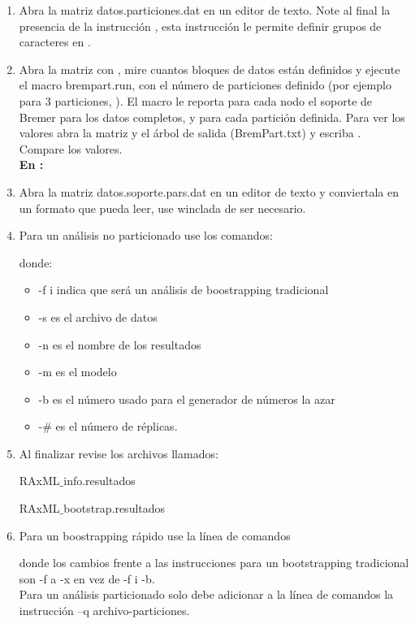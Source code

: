 \begin{enumerate}
\item Abra la matriz datos.particiones.dat en un editor de texto. Note al final la presencia de la instrucci\'on , esta instrucci\'on le permite definir grupos de caracteres en .\\
\item Abra la matriz con , mire cuantos bloques de datos est\'an definidos y ejecute el macro brempart.run, con el n\'umero de particiones definido (por ejemplo para 3 particiones, ). El macro le reporta para cada nodo el soporte de Bremer para los datos completos, y para cada partici\'on definida. Para ver los valores abra la matriz y el \'arbol de salida (BremPart.txt) y escriba . Compare los valores.\\
\textbf{En :}\\
\item Abra la matriz datos.soporte.pars.dat en un editor de texto y conviertala en un formato que  pueda leer, use winclada de ser necesario. \\
\item Para un an\'alisis no particionado use los comandos:


donde:
\begin{itemize}
\item  -f i indica que ser\'a un an\'alisis de boostrapping tradicional
\item  -s es el archivo de datos
\item  -n es el nombre de los resultados
\item  -m es el modelo
\item  -b es el n\'umero usado para el generador de n\'umeros la azar
\item  -$\#$ es el n\'umero de r\'eplicas.
\end{itemize}

\item Al finalizar revise los archivos llamados:

  RAxML$\_$info.resultados 

  RAxML$\_$bootstrap.resultados


\item Para un boostrapping r\'apido use la l\'inea de comandos



donde los cambios frente a las instrucciones para un bootstrapping tradicional son -f a  -x en vez de -f i -b. \\

Para un an\'alisis particionado solo debe adicionar a la l\'inea de comandos la instrucci\'on –q archivo-particiones.
\end{enumerate}

